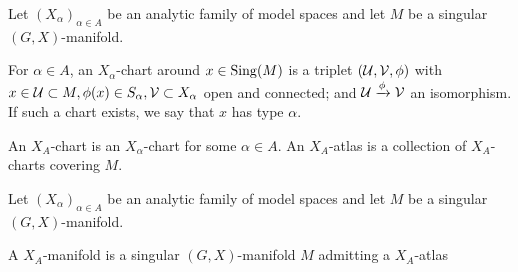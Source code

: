 \begin{defi}[$X_A$-atlas]
  Let $(X_\alpha)_{\alpha\in A}$ be an analytic family of model spaces and let $M$ be a singular $(G,X)$-manifold.
    
  For $\alpha\in A$, an $X_\alpha$-chart around $x\in \mathrm{Sing}(M)$ is a triplet $(\mathcal{U},\mathcal V,\phi)$ with $x\in \mathcal{U}\subset M,\phi(x)\in S_\alpha, \mathcal V\subset X_\alpha$ open and connected;  and $\mathcal{U}\xrightarrow{\phi} \mathcal V$ an isomorphism. If such a chart exists, we say that $x$ has type $\alpha$. 
  
  An $X_A$-chart is an $X_\alpha$-chart for some $\alpha\in A$.  
  An $X_A$-atlas is a collection of $X_A$-charts covering $M$.
\end{defi}
\begin{defi}
  Let $(X_\alpha)_{\alpha\in A}$ be an analytic family of model spaces and let $M$ be a singular $(G,X)$-manifold.
  
  A $X_A$-manifold is a singular $(G,X)$-manifold $M$  admitting  a $X_A$-atlas
\end{defi}



